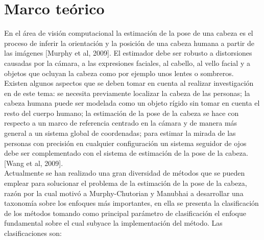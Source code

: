 \chapter{Marco teórico}

    En el área de visión computacional la estimación de la pose de una cabeza es el proceso de inferir la orientación y la posición de una cabeza humana a partir de las imágenes [Murphy et al, 2009]. El estimador debe ser robusto a distorsiones causadas por la cámara, a las expresiones faciales, al cabello, al vello facial y a objetos que ocluyan la cabeza como por ejemplo unos lentes o sombreros.\\
    Existen algunos aspectos que se deben tomar en cuenta al realizar investigación en de este tema: se necesita previamente localizar la cabeza de las personas; la cabeza humana puede ser modelada como un objeto rígido sin tomar en cuenta el resto del cuerpo humano; la estimación de la pose de la  cabeza se hace con respecto a un marco de referencia centrado en la cámara y de manera más general a un sistema global de coordenadas; para estimar la mirada de las personas con precisión en cualquier configuración un sistema seguidor de ojos debe ser complementado con el sistema de estimación de la  pose de la cabeza. [Wang et al, 2009].\\
    Actualmente se han realizado  una gran diversidad de métodos que se pueden emplear para solucionar el problema de la estimación de la pose de la cabeza, razón por la cual motivó a Murphy-Chutorian y Manubhai a desarrollar una taxonomía sobre los enfoques más importantes, en ella se presenta la clasificación de los métodos tomando como principal parámetro de clasificación el enfoque fundamental sobre el cual subyace la implementación del método. Las clasificaciones son:
